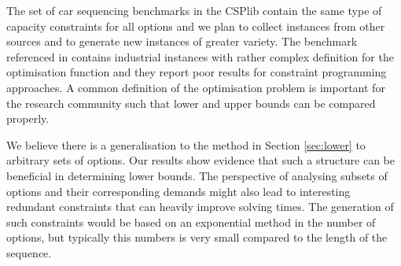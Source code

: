\documentclass[]{llncs}
\begin{document}
The set of car sequencing benchmarks in the CSPlib contain the same type of capacity constraints for all options and we
plan to collect instances from other sources and to generate new instances of greater variety. The benchmark referenced
in \cite{Solnon08} contains industrial instances with rather complex definition for the optimisation function and they
report poor results for constraint programming approaches. A common definition of the optimisation problem is important
for the research community such that lower and upper bounds can be compared properly. 

We believe there is a generalisation to the method in Section \ref{sec:lower} to arbitrary sets of options. Our results
show evidence that such a structure can be beneficial in determining lower bounds. The perspective of analysing subsets
of options and their corresponding demands might also lead to interesting redundant constraints that can heavily improve
solving times. The generation of such constraints would be based on an exponential method in the number of options, but
typically this numbers is very small compared to the length of the sequence. 



\end{document}
